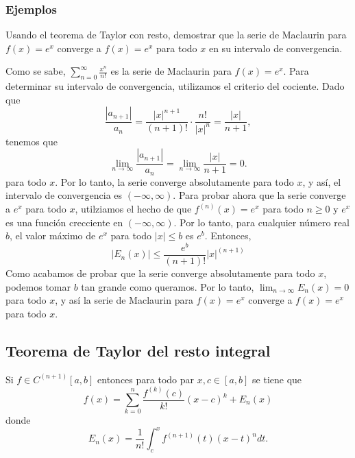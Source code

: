 \documentclass{article}
\begin{document}
\subsubsection{Ejemplos}
\begin{example}{1}
    Usando el teorema de Taylor con resto, demostrar que la serie de Maclaurin para $f(x) = e^x$ converge a $f(x) = e^x$ para todo $x$ en su intervalo de convergencia.
\end{example}
Como se sabe, $\sum_{n=0}^{\infty} \frac{x^n}{n!}$ es la serie de Maclaurin para $f(x) = e^x$. Para determinar su intervalo de convergencia, utilizamos el criterio del cociente. Dado que
\begin{equation*}
    \frac{|a_{n+1}|}{a_n} = \frac{|x|^{n+1}}{(n+1)!} \cdot \frac{n!}{|x|^n} = \frac{|x|}{n+1}, 
\end{equation*}
tenemos que
\begin{equation*}
    \lim_{n\to\infty} \frac{|a_{n+1}|}{a_n} = \lim_{n\to\infty} \frac{|x|}{n+1} = 0.
\end{equation*}
para todo $x$. Por lo tanto, la serie converge absolutamente para todo $x$, y así, el intervalo de convergencia es $(-\infty, \infty)$. Para probar ahora que la serie converge a $e^x$ para todo $x$, utilziamos el hecho de que $f^{(n)}(x) = e^x$ para todo $n\geq 0$ y $e^x$ es una función crecciente en $(-\infty, \infty)$. Por lo tanto, para cualquier número real $b$, el valor máximo de $e^x$ para todo $|x| \le b$ es $e^b$. Entonces,
\begin{equation*}
    |E_n(x)| \le \frac{e^b}{(n+1)!}|x|^{(n+1)}
\end{equation*}  
Como acabamos de probar que la serie converge absolutamente para todo $x$, podemos tomar $b$ tan grande como queramos. Por lo tanto, $\lim_{n\to\infty} E_n(x) = 0$ para todo $x$, y así la serie de Maclaurin para $f(x) = e^x$ converge a $f(x) = e^x$ para todo $x$.

\subsection{Teorema de Taylor del resto integral}
Si $f\in C^{(n+1)}[a,b]$ entonces para todo par $x,c \in [a,b]$ se tiene que 
\begin{equation*}
    f(x) = \sum_{k=0}^{n} \frac{f^{(k)}(c)}{k!}(x-c)^k + E_n(x) 
\end{equation*}
donde 
\begin{equation*}
    E_n(x) = \frac{1}{n!}\int_{c}^{x} f^{(n+1)}(t)(x-t)^ndt.
\end{equation*}
\end{document}
